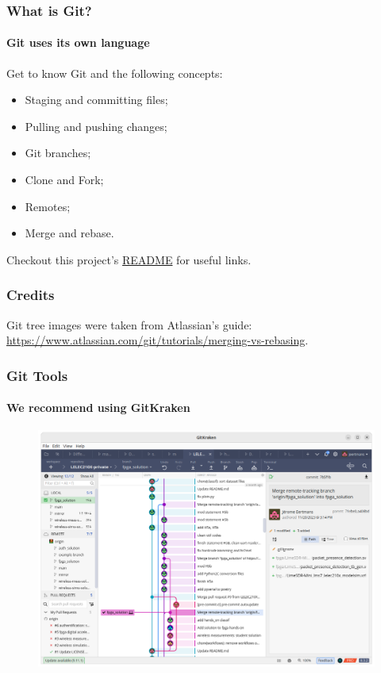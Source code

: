 \documentclass[t, aspectratio=169, english, table]{_style/tudelft-beamer}
\begin{document}
\begin{frame}
  \frametitle{What is Git?}
  \framesubtitle{Git uses its own language}

  Get to know Git and the following concepts:

  \begin{itemize}
      \item Staging and committing files;
      \item Pulling and pushing changes;
      \item Git branches;
      \item Clone and Fork;
      \item Remotes;
      \item Merge and rebase.
  \end{itemize}

  Checkout this project's \href{https://github.com/LELEC210X/LELEC210X}{\color{tud primary}README} for useful links.
  
\end{frame}

\begin{frame}
  \frametitle{Credits}
  
  Git tree images were taken from Atlassian's guide: \url{https://www.atlassian.com/git/tutorials/merging-vs-rebasing}.
\end{frame}

\begin{frame}
  \frametitle{Git Tools}
  \framesubtitle{We recommend using GitKraken}
  
  \begin{figure}
    \centering
    \includegraphics[height=.6\paperheight]{figures/gitkraken.png}
  \end{figure}
  
\end{frame}
\end{document}
